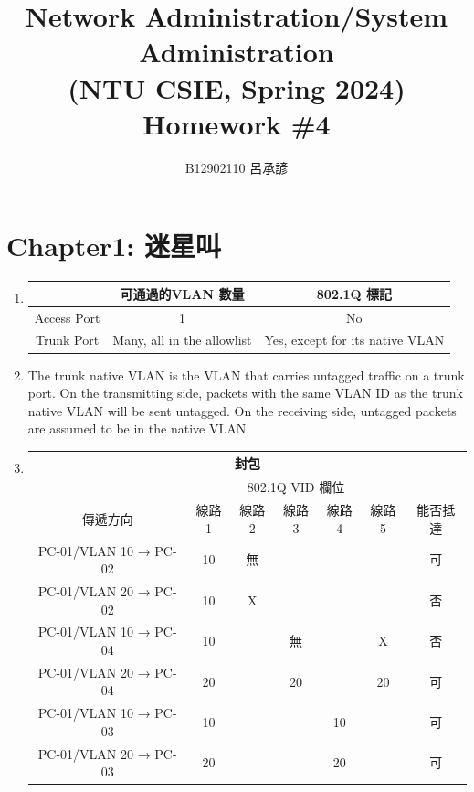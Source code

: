 \documentclass[12pt, a4paper]{article}
\title{
  Network Administration/System Administration\\
  (NTU CSIE, Spring 2024)\\
  Homework \#4
}
\author{\Large B12902110 呂承諺}
\begin{document}
  \maketitle
  \section*{Chapter1: 迷星叫}
  \begin{enumerate}
    \item\phantom{}\vspace{-\baselineskip}

    \begin{tabular}{|c|c|c|}
     \hline
     & 可通過的VLAN 數量 & 802.1Q 標記 \\\hline
     Access Port & 1 & No \\\hline
     Trunk Port & Many, all in the allowlist & Yes, except for its native VLAN \\\hline
    \end{tabular}

    \item The trunk native VLAN is the VLAN that carries untagged traffic on a
    trunk port. On the transmitting side, packets with the same VLAN ID as the
    trunk native VLAN will be sent untagged. On the receiving side, untagged
    packets are assumed to be in the native VLAN.

    \item\phantom{}\vspace{-\baselineskip}

    \begin{tabular}{|c|c|c|c|c|c|c|}
      \hline
      \multicolumn{7}{|c|}{封包} \\\hline
      & \multicolumn{5}{c|}{802.1Q VID 欄位} & \\\hline
      傳遞方向 & 線路1 & 線路2 & 線路3 & 線路4 & 線路5 & 能否抵達 \\\hline
      PC-01/VLAN 10 → PC-02 & 10 & 無 & \cellcolor{gray} & \cellcolor{gray} & \cellcolor{gray} & 可 \\\hline
      PC-01/VLAN 20 → PC-02 & 10 & X & \cellcolor{gray} & \cellcolor{gray} & \cellcolor{gray} & 否 \\\hline
      PC-01/VLAN 10 → PC-04 & 10 & \cellcolor{gray} & 無 & \cellcolor{gray} & X & 否\\\hline
      PC-01/VLAN 20 → PC-04 & 20 & \cellcolor{gray} & 20 & \cellcolor{gray} & 20 & 可\\\hline
      PC-01/VLAN 10 → PC-03 & 10 & \cellcolor{gray} & \cellcolor{gray} & 10 & \cellcolor{gray} & 可 \\\hline
      PC-01/VLAN 20 → PC-03 & 20 & \cellcolor{gray} & \cellcolor{gray} & 20 & \cellcolor{gray} & 可 \\\hline
    \end{tabular}


\end{enumerate}
\end{document}
